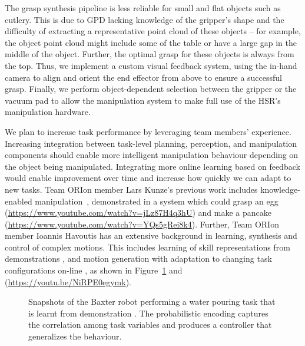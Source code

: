 \documentclass[runningheads,a4paper]{llncs}
\newcommand{\teamori}{Team ORIon}
\begin{document}
The grasp synthesis pipeline is less reliable for small and flat objects such as cutlery.
%
This is due to GPD lacking knowledge of the gripper’s shape and the difficulty of extracting a representative point cloud of these objects -- for example, the object point cloud might include some of the table or have a large gap in the middle of the object.
%
Further, the optimal grasp for these objects is always from the top. Thus, we implement a custom visual feedback system, using the in-hand camera to align and orient the end effector from above to ensure a successful grasp.
%
Finally, we perform object-dependent selection between the gripper or the vacuum pad to allow the manipulation system to make full use of the HSR's manipulation hardware.

We plan to increase task performance by leveraging team members' experience.
%
Increasing integration between task-level planning, perception, and manipulation components should enable more intelligent manipulation behaviour depending on the object being manipulated.
%
Integrating more online learning based on feedback would enable improvement over time and increase how quickly we can adapt to new tasks.
%
\teamori{} member Lars Kunze's previous work includes knowledge-enabled manipulation~\cite{kunze15aij}, demonstrated in a system which could grasp an egg (\url{https://www.youtube.com/watch?v=jLz87H4q3hU}) and make a pancake (\url{https://www.youtube.com/watch?v=YQs5gRei8k4}). 
%
Further, \teamori{} member Ioannis Havoutis has an extensive background in learning, synthesis and control of complex motions.
%
This includes learning of skill representations from demonstrations \cite{Havoutis16SSRR,Havoutis17ICRA}, and motion generation with adaptation to changing task configurations on-line \cite{Zeestraten17IROS,Zeestraten2017-RAL}, as shown in  Figure~\ref{fig:baxter_water_task} and (\url{https://youtu.be/NiRPE0egymk}).

\begin{figure}[!t]
	\centering
	\vspace{-10pt}%
	\caption{Snapshots of the Baxter robot performing a water pouring task that
	is learnt from demonstration \cite{Zeestraten2017-RAL}. The probabilistic
	encoding captures the correlation among task variables and produces a
	controller that generalizes the behaviour.}
	\label{fig:baxter_water_task}
	\vspace{-3ex}
\end{figure}
\end{document}
